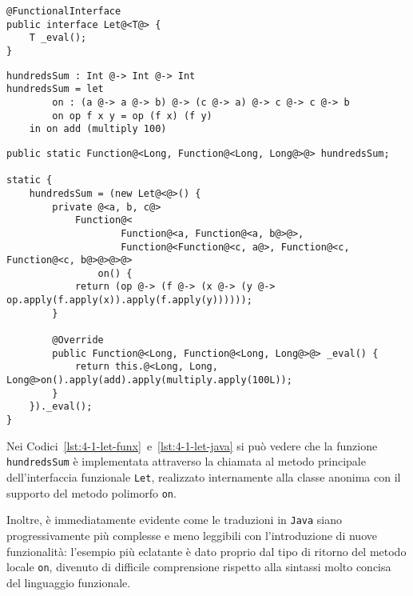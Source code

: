 \vspace{4mm}
\begin{lstlisting}[caption={Interfaccia funzionale per espressioni \texttt{let}}, style=javaCode, label={lst:4-1-let-interface-java}]
@FunctionalInterface
public interface Let@<T@> {
    T _eval();
}
\end{lstlisting}
\vspace{4mm}
\begin{lstlisting}[caption={Espressione \texttt{let} in \textbf{Funx}}, style=funxCode, label={lst:4-1-let-funx}]
hundredsSum : Int @-> Int @-> Int
hundredsSum = let
        on : (a @-> a @-> b) @-> (c @-> a) @-> c @-> c @-> b
        on op f x y = op (f x) (f y)
    in on add (multiply 100)
\end{lstlisting}
\vspace{4mm}
\begin{lstlisting}[caption={Corrispondente classe anonima in \texttt{Java}}, style=javaCode, label={lst:4-1-let-java}]
public static Function@<Long, Function@<Long, Long@>@> hundredsSum;

static {
    hundredsSum = (new Let@<@>() {
        private @<a, b, c@>
            Function@<
                    Function@<a, Function@<a, b@>@>,
                    Function@<Function@<c, a@>, Function@<c, Function@<c, b@>@>@>@>
                on() {
            return (op @-> (f @-> (x @-> (y @-> op.apply(f.apply(x)).apply(f.apply(y))))));
        }

        @Override
        public Function@<Long, Function@<Long, Long@>@> _eval() {
            return this.@<Long, Long, Long@>on().apply(add).apply(multiply.apply(100L));
        }
    })._eval();
}
\end{lstlisting}
\vspace{4mm}

\noindent Nei Codici~\ref{lst:4-1-let-funx}~e~\ref{lst:4-1-let-java} si può vedere che la funzione \texttt{hundredsSum}
è implementata attraverso la chiamata al metodo principale dell'interfaccia funzionale \texttt{Let},
realizzato internamente alla classe anonima con il supporto del metodo polimorfo \texttt{on}.

\noindent Inoltre, è immediatamente evidente come le traduzioni in \texttt{Java} siano progressivamente più complesse e meno leggibili
con l'introduzione di nuove funzionalità: l'esempio più eclatante è dato proprio dal tipo di ritorno del metodo locale \texttt{on},
divenuto di difficile comprensione rispetto alla sintassi molto concisa del linguaggio funzionale.